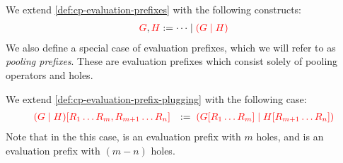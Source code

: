\begin{definition}\label{def:nc-evaluation-prefixes}
  We extend \cref{def:cp-evaluation-prefixes} with the following constructs:
  \begin{align*}
    \textcolor{red}{G}, \textcolor{red}{H} := \dots \mid \textcolor{red}{(G \mid H)}
  \end{align*}
  We also define a special case of evaluation prefixes, which we will refer to
  as \emph{pooling prefixes}. These are evaluation prefixes which consist solely
  of pooling operators and holes. 
\end{definition}
\begin{definition}[Plugging]\label{def:nc-evaluation-prefix-plugging}
  We extend \cref{def:cp-evaluation-prefix-plugging} with the following case:
  \[
    \begin{array}{ll}
      \textcolor{red}{{(G \mid H)}[{R_1 \dots R_m, R_{m+1} \dots R_{n}}]}
                            & := \; \textcolor{red}{({G}[{R_1 \dots R_m}] \mid {H}[{R_{m+1} \dots R_n}])}
    \end{array}
  \]
  Note that in the this case,  is an evaluation prefix with $m$ holes,
  and  is an evaluation prefix with $(m-n)$ holes.
\end{definition}
